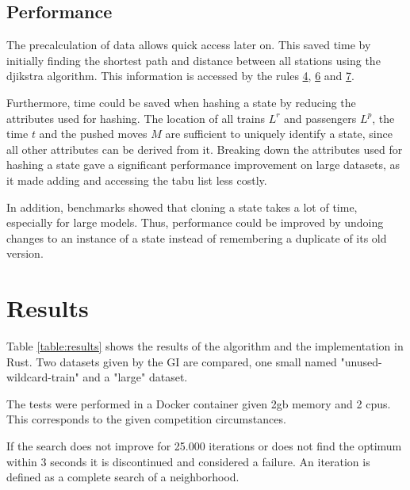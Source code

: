 \documentclass[a4paper,12pt,parskip]{article}
\begin{document}
\subsection{Performance}

The precalculation of data allows quick access later on. This saved time by initially
finding the shortest path and distance between all stations using the djikstra 
algorithm. This information is accessed by the rules \hyperref[rule:4]{4}, 
\hyperref[rule:6]{6} and \hyperref[rule:7]{7}.

Furthermore, time could be saved when hashing a state by reducing the attributes 
used for hashing. The location of all trains $L^r$ and passengers $L^p$, the time 
$t$ and the pushed moves $M$ are sufficient to uniquely identify a state, since 
all other attributes can be derived from it. Breaking down the attributes used 
for hashing a state gave a significant performance improvement on large datasets, 
as it made adding and accessing the tabu list less costly.

In addition, benchmarks showed that cloning a state takes a lot of time, especially 
for large models. Thus, performance could be improved by undoing changes to an 
instance of a state instead of remembering a duplicate of its old version.

\section{Results}

Table \ref{table:results} shows the results of the algorithm and the 
implementation in Rust. Two datasets given by the GI are compared, one small 
named "unused-wildcard-train" and a "large" dataset. 

The tests were performed in a Docker container given 2gb memory and 2 cpus. This 
corresponds to the given competition circumstances.

If the search does not improve for 25.000 iterations or does not find the optimum 
within $3$ seconds it is discontinued and considered a failure. An iteration 
is defined as a complete search of a neighborhood.

\newpage
\end{document}
